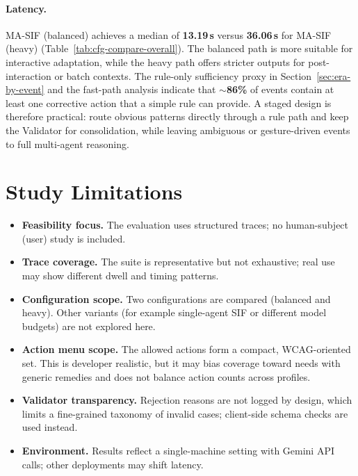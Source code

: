 \documentclass[openany]{book}
\begin{document}
\paragraph{Latency.}
MA-SIF (balanced) achieves a median of \textbf{13.19\,s} versus \textbf{36.06\,s} for MA-SIF (heavy) (Table~\ref{tab:cfg-compare-overall}). The balanced path is more suitable for interactive adaptation, while the heavy path offers stricter outputs for post-interaction or batch contexts. The rule-only sufficiency proxy in Section~\ref{sec:era-by-event} and the fast-path analysis indicate that \(\sim\)\textbf{86\%} of events contain at least one corrective action that a simple rule can provide. A staged design is therefore practical: route obvious patterns directly through a rule path and keep the Validator for consolidation, while leaving ambiguous or gesture-driven events to full multi-agent reasoning.

\section{Study Limitations}
\begin{itemize}
  \item \textbf{Feasibility focus.} The evaluation uses structured traces; no human-subject (user) study is included.
  \item \textbf{Trace coverage.} The suite is representative but not exhaustive; real use may show different dwell and timing patterns.
  \item \textbf{Configuration scope.} Two configurations are compared (balanced and heavy). Other variants (for example single-agent SIF or different model budgets) are not explored here.
  \item \textbf{Action menu scope.} The allowed actions form a compact, WCAG-oriented set. This is developer realistic, but it may bias coverage toward needs with generic remedies and does not balance action counts across profiles.
  \item \textbf{Validator transparency.} Rejection reasons are not logged by design, which limits a fine-grained taxonomy of invalid cases; client-side schema checks are used instead.
  \item \textbf{Environment.} Results reflect a single-machine setting with Gemini API calls; other deployments may shift latency.
\end{itemize}
\end{document}
